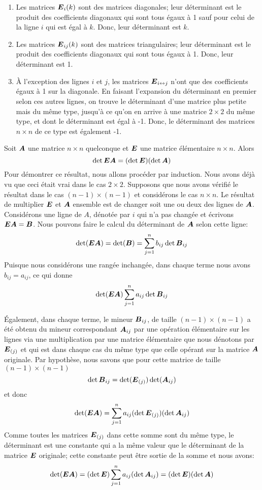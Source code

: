 \begin{enumerate}
\item Les matrices $\boldsymbol{E}_{i}(k)$ sont des matrices diagonales; 
leur déterminant est le produit des coefficients diagonaux qui sont tous égaux à 1 sauf pour celui de la ligne $i$ qui est égal à $k$. Donc, leur déterminant est $k$.
\item Les matrices $\boldsymbol{E}_{ij}(k)$ sont des matrices triangulaires; 
leur déterminant est le produit des coefficients diagonaux qui sont tous égaux à 1. Donc, leur déterminant est 1.
\item À l'exception des lignes $i$ et $j$, les matrices $\boldsymbol{E}_{i\leftrightarrow j}$ n'ont que des coefficients égaux à 1 sur la
diagonale.  En faisant l'expansion du déterminant en premier selon ces autres lignes, on trouve le déterminant d'une matrice plus
petite mais du même type, jusqu'à ce qu'on en arrive à une matrice $2\times  2$ du même type, et dont le déterminant est égal à
-1.  Donc, le déterminant des matrices $n\times  n$ de ce type est également -1.
\end{enumerate}
\begin{theo}
Soit $\boldsymbol{A}$ une matrice $n\times  n$ quelconque et $\boldsymbol{E}$ une matrice élémentaire $n\times  n$. Alors
\[
\det \boldsymbol{E}\boldsymbol{A} = (\det \boldsymbol{E}) (\det \boldsymbol{A})
\]
\proof
Pour démontrer ce résultat, nous allons procéder par induction.  Nous avons déjà vu que ceci était vrai dans le cas $2\times 2$.
Supposons que nous avons vérifié le résultat dans le cas $(n-1)\times (n-1)$ et considérons le cas $n\times  n$.  Le résultat de
multiplier $\boldsymbol{E}$ et $\boldsymbol{A}$ ensemble est de changer soit une ou deux des lignes de $\boldsymbol{A}$.  Considérons une ligne
de $A$, dénotée par $i$ qui n'a pas changée et écrivons $\boldsymbol{E}\boldsymbol{A} = \boldsymbol{B}$.  Nous pouvons faire le calcul du déterminant de $\boldsymbol{A}$ selon cette ligne:
\[
\det(\boldsymbol{E}\boldsymbol{A}) = \det(\boldsymbol{B}) =  \sum_{j=1}^n b_{ij} \det \boldsymbol{B}_{ij}
\]
Puisque nous considérons une rangée inchangée, dans chaque terme nous avons $b_{ij}=a_{ij}$, ce qui donne
\[
\det(\boldsymbol{E}\boldsymbol{A}) \sum_{j=1}^n a_{ij} \det \boldsymbol{B}_{ij}
\]

Également, dans chaque terme, le mineur $\boldsymbol{B}_{ij}$, de taille $(n-1)\times (n-1)$ 
a été obtenu du mineur correspondant $\boldsymbol{A}_{ij}$ par une 
opération élémentaire sur les lignes via une multiplication par une matrice élémentaire que 
nous dénotons par $\boldsymbol{E}_{(j)}$ et qui est dans chaque cas du même type que
celle opérant sur la matrice $\boldsymbol{A}$ originale.  Par hypothèse, nous savons que pour cette matrice de taille 
$(n-1)\times (n-1)$ 
\[
\det \boldsymbol{B}_{ij} = \det(\boldsymbol{E}_{(j)} )\det(\boldsymbol{A}_{ij})
\]
et donc
\[
\det(\boldsymbol{E}\boldsymbol{A}) = \sum_{j=1}^n a_{ij} (\det\boldsymbol{E}_{(j)} )(\det \boldsymbol{A}_{ij})
\]
Comme toutes les matrices $\boldsymbol{E}_{(j)} $ dans cette somme sont du même type, le déterminant est une constante
qui a la même valeur que le déterminant de la matrice $\boldsymbol{E}$ originale; cette constante
peut être sortie de la somme et nous avons:
\[
\det(\boldsymbol{E}\boldsymbol{A}) = (\det\boldsymbol{E})\sum_{j=1}^n a_{ij} (\det \boldsymbol{A}_{ij}) = (\det\boldsymbol{E})(\det\boldsymbol{A})
\]
\cqfd
\end{theo}

